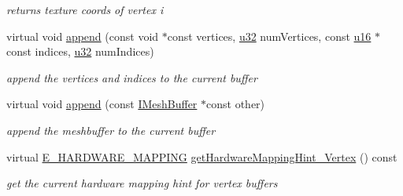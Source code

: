 \begin{DoxyCompactItemize}
\begin{DoxyCompactList}\small\item\em returns texture coords of vertex i \end{DoxyCompactList}\item 
\mbox{\label{structirr_1_1scene_1_1SSkinMeshBuffer_aded60392b4d793804bbf417c6bafa5f9}} 
virtual void \hyperlink{structirr_1_1scene_1_1SSkinMeshBuffer_aded60392b4d793804bbf417c6bafa5f9}{append} (const void $\ast$const vertices, \hyperlink{namespaceirr_a0416a53257075833e7002efd0a18e804}{u32} num\+Vertices, const \hyperlink{namespaceirr_ae9f8ec82692ad3b83c21f555bfa70bcc}{u16} $\ast$const indices, \hyperlink{namespaceirr_a0416a53257075833e7002efd0a18e804}{u32} num\+Indices)
\begin{DoxyCompactList}\small\item\em append the vertices and indices to the current buffer \end{DoxyCompactList}\item 
\mbox{\label{structirr_1_1scene_1_1SSkinMeshBuffer_a5395bc06c4c6b1c9a82dbdd56916a9e0}} 
virtual void \hyperlink{structirr_1_1scene_1_1SSkinMeshBuffer_a5395bc06c4c6b1c9a82dbdd56916a9e0}{append} (const \hyperlink{classirr_1_1scene_1_1IMeshBuffer}{I\+Mesh\+Buffer} $\ast$const other)
\begin{DoxyCompactList}\small\item\em append the meshbuffer to the current buffer \end{DoxyCompactList}\item 
\mbox{\label{structirr_1_1scene_1_1SSkinMeshBuffer_a1f969cf6a394f4dce500ba446e150c88}} 
virtual \hyperlink{namespaceirr_1_1scene_ac7d8ee8d77da75f2580bb9bb17231c27}{E\+\_\+\+H\+A\+R\+D\+W\+A\+R\+E\+\_\+\+M\+A\+P\+P\+I\+NG} \hyperlink{structirr_1_1scene_1_1SSkinMeshBuffer_a1f969cf6a394f4dce500ba446e150c88}{get\+Hardware\+Mapping\+Hint\+\_\+\+Vertex} () const
\begin{DoxyCompactList}\small\item\em get the current hardware mapping hint for vertex buffers \end{DoxyCompactList}\item 
\mbox{\label{structirr_1_1scene_1_1SSkinMeshBuffer_a3f1c1c7652af10b2de87ae24ff2989ff}} 

\end{DoxyCompactItemize}
